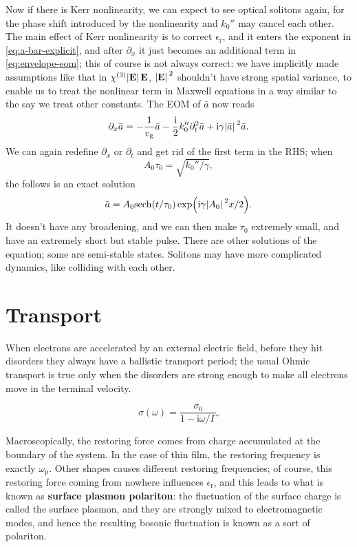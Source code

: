 \documentclass[hyperref, a4paper]{article}
\newcommand*{\ii}{\mathrm{i}}
\newcommand*{\concept}[1]{{\textbf{#1}}}
\newcommand{\epsr}{\epsilon_{\text{r}}}
\begin{document}
Now if there is Kerr nonlinearity, we can expect to see optical solitons again,
for the phase shift introduced by the nonlinearity and $k_0''$ may cancel each other.
The main effect of Kerr nonlinearity is to correct $\epsr$,
and it enters the exponent in \eqref{eq:a-bar-explicit},
and after $\partial_x$ it just becomes an additional term in \eqref{eq:envelope-eom}; 
this of course is not always correct: 
we have implicitly made assumptions like that in $\chi^{(3)} \abs*{\vb{E}} \vb{E}$, 
$\abs*{\vb{E}}^2$ shouldn't have strong spatial variance, 
to enable us to treat the nonlinear term in Maxwell equations 
in a way similar to the say we treat other constants. 
The EOM of $\bar{a}$ now reads 
\begin{equation}
    \partial_x \bar{a} = - \frac{1}{v_{\text{g}}} \bar{a} 
    - \frac{\ii}{2} k_0'' \partial_t^2 \bar{a} 
    + \ii \gamma \abs*{\bar{a}}^2 \bar{a}.
\end{equation}
We can again redefine $\partial_x$ or $\partial_t$ and get rid of the first term in the RHS; 
when 
\begin{equation}
    A_0 \tau_0 = \sqrt{k_0'' / \gamma},
\end{equation}
the follows is an exact solution
\begin{equation}
    \bar{a} = A_0 \mathrm{sech} (t / \tau_0) \exp(\ii \gamma \abs*{A_0}^2 x / 2).
\end{equation}
It doesn't have any broadening, and we can then make $\tau_0$ extremely small,
and have an extremely short but stable pulse.
There are other solutions of the equation;
some are semi-stable states.
Solitons may have more complicated dynamics,
like colliding with each other.

\section{Transport}

When electrons are accelerated by an external electric field, 
before they hit disorders they always have a ballistic transport period; 
the usual Ohmic transport is true only when 
the disorders are strong enough to make all electrons
move in the terminal velocity. 

\begin{equation}
    \sigma(\omega) = \frac{\sigma_0}{1 - \ii \omega / \Gamma}.
\end{equation}

Macroscopically, the restoring force comes from charge accumulated at the boundary of the system.
In the case of thin film, the restoring frequency is exactly $\omega_{\text{p}}$.
Other shapes causes different restoring frequencies;
of course, this restoring force coming from nowhere influences $\epsr$, 
and this leads to what is known as \concept{surface plasmon polariton}: 
the fluctuation of the surface charge is called the surface plasmon, 
and they are strongly mixed to electromagnetic modes, 
and hence the resulting bosonic fluctuation is known as a sort of polariton.
\end{document}

